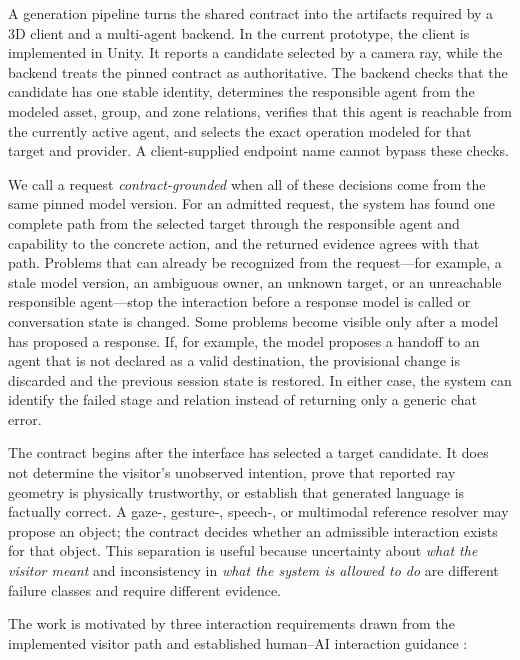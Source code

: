 A generation pipeline turns the shared contract into the artifacts required by
a 3D client and a multi-agent backend.  In the current prototype, the client is
implemented in Unity.  It reports a candidate selected by a camera ray, while
the backend treats the pinned contract as authoritative.  The backend checks
that the candidate has one stable identity, determines the responsible agent
from the modeled asset, group, and zone relations, verifies that this agent is
reachable from the currently active agent, and selects the exact operation
modeled for that target and provider.  A client-supplied endpoint name cannot
bypass these checks.

We call a request \emph{contract-grounded} when all of these decisions come from
the same pinned model version.  For an admitted request, the system has found
one complete path from the selected target through the responsible agent and
capability to the concrete action, and the returned evidence agrees with that
path.  Problems that can already be recognized from the request---for example,
a stale model version, an ambiguous owner, an unknown target, or an unreachable
responsible agent---stop the interaction before a response model is called or
conversation state is changed.  Some problems become visible only after a model
has proposed a response.  If, for example, the model proposes a handoff to an
agent that is not declared as a valid destination, the provisional change is
discarded and the previous session state is restored.  In either case, the
system can identify the failed stage and relation instead of returning only a
generic chat error.

The contract begins after the interface has selected a target candidate.  It
does not determine the visitor's unobserved intention, prove that reported ray
geometry is physically trustworthy, or establish that generated language is
factually correct.  A gaze-, gesture-, speech-, or multimodal reference resolver
may propose an object; the contract decides whether an admissible interaction
exists for that object.  This separation is useful because uncertainty about
\emph{what the visitor meant} and inconsistency in \emph{what the system is
allowed to do} are different failure classes and require different evidence.

The work is motivated by three interaction requirements drawn from the
implemented visitor path and established human--AI interaction guidance
\cite{amershi2019guidelines,yang2020reexamining,weisz2024design}:

